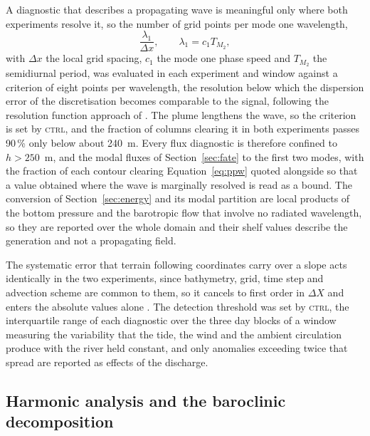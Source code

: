 \documentclass[a4paper,fleqn]{cas-sc}
\newcommand{\CTRL}{\textsc{ctrl}}
\begin{document}
A diagnostic that describes a propagating wave is meaningful only where both experiments resolve it, so the number of grid points per mode one wavelength,
\begin{equation}
\frac{\lambda_{1}}{\Delta x} ,
\qquad
\lambda_{1}=c_{1}T_{M_{2}} ,
\label{eq:ppw}
\end{equation}
with $\Delta x$ the local grid spacing, $c_{1}$ the mode one phase speed and $T_{M_{2}}$ the semidiurnal period, was evaluated in each experiment and window against a criterion of eight points per wavelength, the resolution below which the dispersion error of the discretisation becomes comparable to the signal, following the resolution function approach of \citet{halberg_2013}. The plume lengthens the wave, so the criterion is set by \CTRL{}, and the fraction of columns clearing it in both experiments passes 90\,\% only below about 240~m. Every flux diagnostic is therefore confined to $h>250$~m, and the modal fluxes of Section~\ref{sec:fate} to the first two modes, with the fraction of each contour clearing Equation~\ref{eq:ppw} quoted alongside so that a value obtained where the wave is marginally resolved is read as a bound. The conversion of Section~\ref{sec:energy} and its modal partition are local products of the bottom pressure and the barotropic flow that involve no radiated wavelength, so they are reported over the whole domain and their shelf values describe the generation and not a propagating field.

The systematic error that terrain following coordinates carry over a slope acts identically in the two experiments, since bathymetry, grid, time step and advection scheme are common to them, so it cancels to first order in $\Delta X$ and enters the absolute values alone \citep{haney:1991,mellor:1994,shchepetkin:2003}. The detection threshold was set by \CTRL{}, the interquartile range of each diagnostic over the three day blocks of a window measuring the variability that the tide, the wind and the ambient circulation produce with the river held constant, and only anomalies exceeding twice that spread are reported as effects of the discharge.

\subsection{Harmonic analysis and the baroclinic decomposition}
\label{sec:harmonic}
\end{document}
